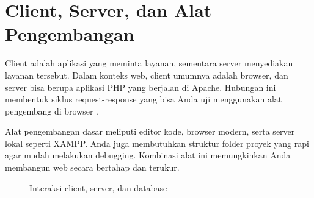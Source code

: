\section{Client, Server, dan Alat Pengembangan}
Client adalah aplikasi yang meminta layanan, sementara server menyediakan layanan tersebut. Dalam konteks web, client umumnya adalah browser, dan server bisa berupa aplikasi PHP yang berjalan di Apache. Hubungan ini membentuk siklus request-response yang bisa Anda uji menggunakan alat pengembang di browser \cite{webdevLearn}.

Alat pengembangan dasar meliputi editor kode, browser modern, serta server lokal seperti XAMPP. Anda juga membutuhkan struktur folder proyek yang rapi agar mudah melakukan debugging. Kombinasi alat ini memungkinkan Anda membangun web secara bertahap dan terukur.

\begin{figure}[h]
\centering
{}
\caption{Interaksi client, server, dan database}
\end{figure}

